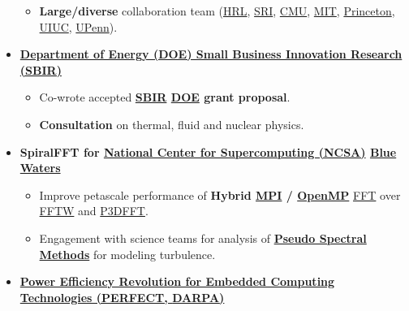 \documentclass{article}
\begin{document}
\begin{itemize}
\begin{itemize}
    \item \textbf{Large/diverse} collaboration team (\href{http://www.hrl.com/}{HRL}, \href{http://www.sri.com/}{SRI}, \href{http://www.cmu.edu/}{CMU}, \href{http://web.mit.edu/}{MIT}, \href{http://www.princeton.edu/}{Princeton}, \href{http://illinois.edu/}{UIUC}, \href{http://www.upenn.edu/}{UPenn}).


  \end{itemize}

\item \textbf{\href{http://science.energy.gov/sbir/}{Department of Energy (DOE) Small Business Innovation Research (SBIR)}}

  \begin{itemize}
    \item Co-wrote accepted \textbf{\href{https://www.sbir.gov/about/about-sbir}{SBIR} \href{http://science.energy.gov/sbir/}{DOE} grant proposal}. 
    \item \textbf{Consultation} on thermal, fluid and nuclear physics.
  \end{itemize}

\item \textbf{SpiralFFT for \href{http://www.ncsa.illinois.edu}{National Center for Supercomputing  (NCSA)} \href{http://www.ncsa.illinois.edu/enabling/bluewaters}{Blue Waters}}

  \begin{itemize}
    \item Improve petascale performance of \textbf{Hybrid \href{http://en.wikipedia.org/wiki/Message_Passing_Interface}{MPI} / \href{http://en.wikipedia.org/wiki/OpenMP}{OpenMP}} \href{https://en.wikipedia.org/wiki/Fast_Fourier_transform}{FFT} over \href{http://www.fftw.org/}{FFTW} and \href{https://code.google.com/p/p3dfft/}{P3DFFT}.   
    \item Engagement with science teams for analysis of \textbf{\href{https://en.wikipedia.org/wiki/Pseudo-spectral_method}{Pseudo Spectral Methods}} for modeling turbulence. 
  \end{itemize}
  
\item \textbf{\href{http://www.darpa.mil/Our_Work/MTO/Programs/Power_Efficiency_Revolution_for_Embedded_Computing_Technologies_(PERFECT).aspx}{Power Efficiency Revolution for Embedded Computing Technologies (PERFECT, \href{http://www.darpa.mil/default.aspx}{DARPA})}}


\end{itemize}
\end{document}
